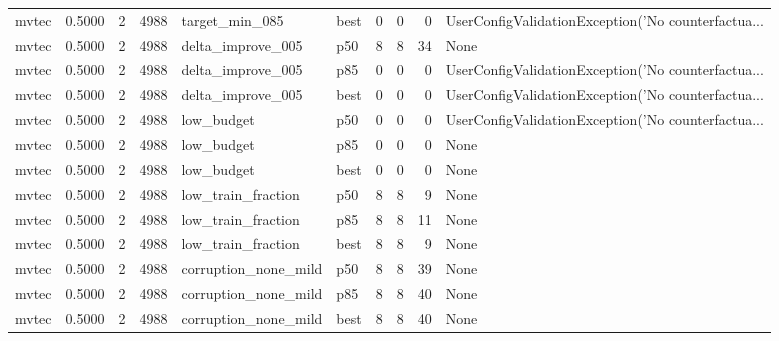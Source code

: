 \begin{tabular}{lrrrllrrrl}
   mvtec &    0.5000 &    2 &   4988 &       target\_min\_085 &   best &               0 &          0 &       0 & UserConfigValidationException('No counterfactua... \\
   mvtec &    0.5000 &    2 &   4988 &    delta\_improve\_005 &    p50 &               8 &          8 &      34 &                                               None \\
   mvtec &    0.5000 &    2 &   4988 &    delta\_improve\_005 &    p85 &               0 &          0 &       0 & UserConfigValidationException('No counterfactua... \\
   mvtec &    0.5000 &    2 &   4988 &    delta\_improve\_005 &   best &               0 &          0 &       0 & UserConfigValidationException('No counterfactua... \\
   mvtec &    0.5000 &    2 &   4988 &           low\_budget &    p50 &               0 &          0 &       0 & UserConfigValidationException('No counterfactua... \\
   mvtec &    0.5000 &    2 &   4988 &           low\_budget &    p85 &               0 &          0 &       0 &                                               None \\
   mvtec &    0.5000 &    2 &   4988 &           low\_budget &   best &               0 &          0 &       0 &                                               None \\
   mvtec &    0.5000 &    2 &   4988 &   low\_train\_fraction &    p50 &               8 &          8 &       9 &                                               None \\
   mvtec &    0.5000 &    2 &   4988 &   low\_train\_fraction &    p85 &               8 &          8 &      11 &                                               None \\
   mvtec &    0.5000 &    2 &   4988 &   low\_train\_fraction &   best &               8 &          8 &       9 &                                               None \\
   mvtec &    0.5000 &    2 &   4988 & corruption\_none\_mild &    p50 &               8 &          8 &      39 &                                               None \\
   mvtec &    0.5000 &    2 &   4988 & corruption\_none\_mild &    p85 &               8 &          8 &      40 &                                               None \\
   mvtec &    0.5000 &    2 &   4988 & corruption\_none\_mild &   best &               8 &          8 &      40 &                                               None \\

\end{tabular}
